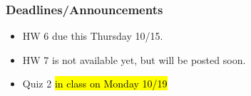 
\begin{frame}
    \frametitle{Deadlines/Announcements}
\begin{itemize}
            \item HW 6 due this Thursday 10/15.
            \item HW 7 is not available yet, but will be posted soon.
            \item Quiz 2 \hl{in class on Monday 10/19} %
        \end{itemize}
\end{frame}
